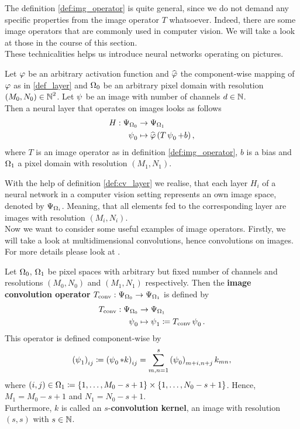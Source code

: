The definition \ref{def:img_operator} is quite general, since we do not demand any specific properties from the image operator $T$ whatsoever. Indeed, there are some image operators that are commonly used in computer vision. We will take a look at those in the course of this section.\\
These technicalities helps us introduce neural networks operating on pictures.

\begin{definition}\label{def:cv_layer}
Let $\operatorname{\varphi}$ be an arbitrary activation function and $\widehat{\operatorname{\varphi}}$ the component-wise mapping of $\operatorname{\varphi}$ as in \ref{def_layer} and $\Omega_0$ be an arbitrary pixel domain with resolution $(M_0,N_0)\in\operatorname{\mathbb{N}}^2$. Let $\operatorname{\psi}$ be an image with number of channels $d\in\operatorname{\mathbb{N}}$.\\
Then a neural layer that operates on images looks as follows
\begin{align*}
H: \Psi_{\Omega_0} &\to \Psi_{\Omega_1}\\
\operatorname{\psi}_0 &\mapsto \widehat{\operatorname{\varphi}}\left(T\operatorname{\psi}_0 + b\right),
\end{align*}
where $T$ is an image operator as in definition \ref{def:img_operator}, $b$ is a bias and $\Omega_1$ a pixel domain with resolution $(M_1,N_1)$.
\end{definition}

With the help of definition \ref{def:cv_layer} we realise, that each layer $H_i$ of a neural network in a computer vision setting represents an own image space, denoted by $\Psi_{\Omega_i}$. Meaning, that all elements fed to the corresponding layer are images with resolution $(M_i,N_i)$.\\
Now we want to consider some useful examples of image operators. Firstly, we will take a look at multidimensional convolutions, hence convolutions on images. For more details please look at \cite[chapter~9]{goodfellow2016deep}.

\begin{definition}\label{def:convolution_op}
Let $\Omega_0$, $\Omega_1$ be pixel spaces with arbitrary but fixed number of channels and resolutions $(M_0,N_0)$ and $(M_1,N_1)$ respectively. Then the \textbf{image convolution operator} $T_{\text{conv}}: \Psi_{\Omega_0} \to \Psi_{\Omega_1}$ is defined by
\begin{align*}
T_{\text{conv}}: \Psi_{\Omega_0} &\to \Psi_{\Omega_1}\\
\operatorname{\psi}_0 &\mapsto \operatorname{\psi}_1 \coloneqq T_{\text{conv}}\operatorname{\psi}_0 .
\end{align*}
This operator is defined component-wise by
\begin{align}
\left( \operatorname{\psi}_1 \right)_{ij} \coloneqq  \left( \operatorname{\psi}_0 \ast k \right)_{ij} = \sum_{m,n=1}^s \left(\operatorname{\psi}_0\right)_{m+i,n+j}k_{mn},
\end{align}
where $(i,j) \in \Omega_1 \coloneqq \{1,\ldots, M_0-s+1\} \times \{1,\ldots, N_0-s+1\}$. Hence, $M_1 = M_0-s+1$ and $N_1 = N_0-s+1$.\\
Furthermore, $k$ is called an $s$-\textbf{convolution kernel}, an image with resolution $(s,s)$ with $s\in\operatorname{\mathbb{N}}$.
\end{definition}

